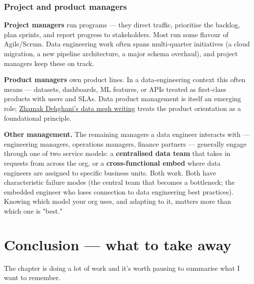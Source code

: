\subsubsection{Project and product managers}

\textbf{Project managers} run programs — they direct traffic, prioritise the backlog, plan sprints, and report progress to stakeholders. Most run some flavour of Agile/Scrum. Data engineering work often spans multi-quarter initiatives (a cloud migration, a new pipeline architecture, a major schema overhaul), and project managers keep these on track.

\textbf{Product managers} own product lines. In a data-engineering context this often means  — datasets, dashboards, ML features, or APIs treated as first-class products with users and SLAs. Data product management is itself an emerging role; \href{https://martinfowler.com/articles/data-mesh-principles.html}{Zhamak Dehghani's data mesh writing} treats the product orientation as a foundational principle.

\textbf{Other management.} The remaining managers a data engineer interacts with — engineering managers, operations managers, finance partners — generally engage through one of two service models: a \textbf{centralised data team} that takes in requests from across the org, or a \textbf{cross-functional embed} where data engineers are assigned to specific business units. Both work. Both have characteristic failure modes (the central team that becomes a bottleneck; the embedded engineer who loses connection to data engineering best practices). Knowing which model your org uses, and adapting to it, matters more than which one is "best."

\section{Conclusion — what to take away}

The chapter is doing a lot of work and it's worth pausing to summarise what I want to remember.

